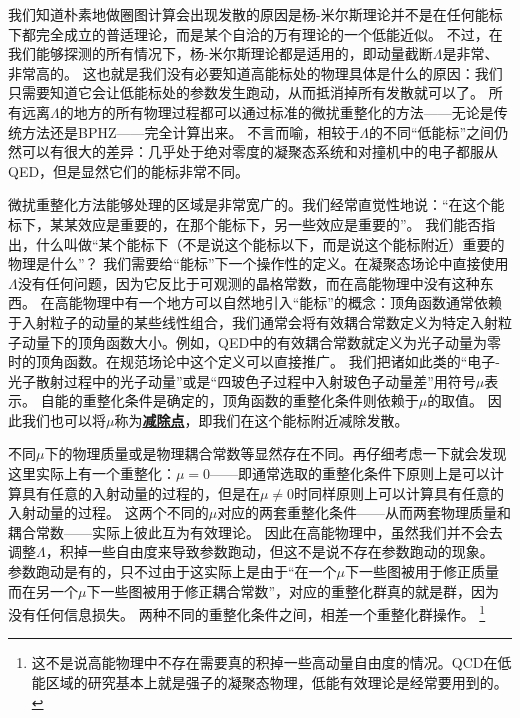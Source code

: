 \documentclass[hyperref, UTF8, a4paper]{ctexart}
\newcommand{\concept}[1]{\underline{\textbf{#1}}}
\begin{document}
我们知道朴素地做圈图计算会出现发散的原因是杨-米尔斯理论并不是在任何能标下都完全成立的普适理论，而是某个自洽的万有理论的一个低能近似。
不过，在我们能够探测的所有情况下，杨-米尔斯理论都是适用的，即动量截断$\Lambda$是非常、非常高的。
这也就是我们没有必要知道高能标处的物理具体是什么的原因：我们只需要知道它会让低能标处的参数发生跑动，从而抵消掉所有发散就可以了。
所有远离$\Lambda$的地方的所有物理过程都可以通过标准的微扰重整化的方法——无论是传统方法还是BPHZ——完全计算出来。
不言而喻，相较于$\Lambda$的不同“低能标”之间仍然可以有很大的差异：几乎处于绝对零度的凝聚态系统和对撞机中的电子都服从QED，但是显然它们的能标非常不同。

微扰重整化方法能够处理的区域是非常宽广的。我们经常直觉性地说：“在这个能标下，某某效应是重要的，在那个能标下，另一些效应是重要的”。
我们能否指出，什么叫做“某个能标下（不是说这个能标以下，而是说这个能标附近）重要的物理是什么”？
我们需要给“能标”下一个操作性的定义。在凝聚态场论中直接使用$\Lambda$没有任何问题，因为它反比于可观测的晶格常数，而在高能物理中没有这种东西。
在高能物理中有一个地方可以自然地引入“能标”的概念：顶角函数通常依赖于入射粒子的动量的某些线性组合，我们通常会将有效耦合常数定义为特定入射粒子动量下的顶角函数大小。例如，QED中的有效耦合常数就定义为光子动量为零时的顶角函数。在规范场论中这个定义可以直接推广。
我们把诸如此类的“电子-光子散射过程中的光子动量”或是“四玻色子过程中入射玻色子动量差”用符号$\mu$表示。
自能的重整化条件是确定的，顶角函数的重整化条件则依赖于$\mu$的取值。
因此我们也可以将$\mu$称为\concept{减除点}，即我们在这个能标附近减除发散。

不同$\mu$下的物理质量或是物理耦合常数等显然存在不同。再仔细考虑一下就会发现这里实际上有一个重整化：$\mu=0$——即通常选取的重整化条件下原则上是可以计算具有任意的入射动量的过程的，但是在$\mu \neq 0$时同样原则上可以计算具有任意的入射动量的过程。
这两个不同的$\mu$对应的两套重整化条件——从而两套物理质量和耦合常数——实际上彼此互为有效理论。
因此在高能物理中，虽然我们并不会去调整$\Lambda$，积掉一些自由度来导致参数跑动，但这不是说不存在参数跑动的现象。
参数跑动是有的，只不过由于这实际上是由于“在一个$\mu$下一些图被用于修正质量而在另一个$\mu$下一些图被用于修正耦合常数”，对应的重整化群真的就是群，因为没有任何信息损失。
两种不同的重整化条件之间，相差一个重整化群操作。%
\footnote{
    这不是说高能物理中不存在需要真的积掉一些高动量自由度的情况。QCD在低能区域的研究基本上就是强子的凝聚态物理，低能有效理论是经常要用到的。
}%
\end{document}
